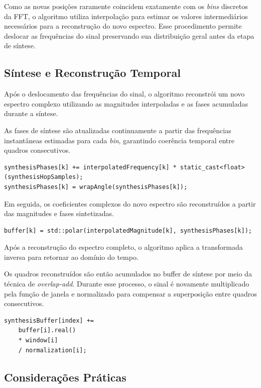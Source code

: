 Como as novas posições raramente coincidem exatamente com os \textit{bins} discretos da FFT, o algoritmo utiliza interpolação para estimar os valores intermediários necessários para a reconstrução do novo espectro. Esse procedimento permite deslocar as frequências do sinal preservando sua distribuição geral antes da etapa de síntese.

\subsection{Síntese e Reconstrução Temporal}

Após o deslocamento das frequências do sinal, o algoritmo reconstrói um novo espectro complexo utilizando as magnitudes interpoladas e as fases acumuladas durante a síntese.

As fases de síntese são atualizadas continuamente a partir das frequências instantâneas estimadas para cada \textit{bin}, garantindo coerência temporal entre quadros consecutivos.

\begin{verbatim}
synthesisPhases[k] += interpolatedFrequency[k] * static_cast<float>(synthesisHopSamples);
synthesisPhases[k] = wrapAngle(synthesisPhases[k]);
\end{verbatim}

Em seguida, os coeficientes complexos do novo espectro são reconstruídos a partir das magnitudes e fases sintetizadas.

\begin{verbatim}
buffer[k] = std::polar(interpolatedMagnitude[k], synthesisPhases[k]);
\end{verbatim}

Após a reconstrução do espectro completo, o algoritmo aplica a transformada inversa para retornar ao domínio do tempo.

Os quadros reconstruídos são então acumulados no buffer de síntese por meio da técnica de \textit{overlap-add}. Durante esse processo, o sinal é novamente multiplicado pela função de janela e normalizado para compensar a superposição entre quadros consecutivos.

\begin{verbatim}
synthesisBuffer[index] +=
    buffer[i].real()
    * window[i]
    / normalization[i];
\end{verbatim}

\subsection{Considerações Práticas}

